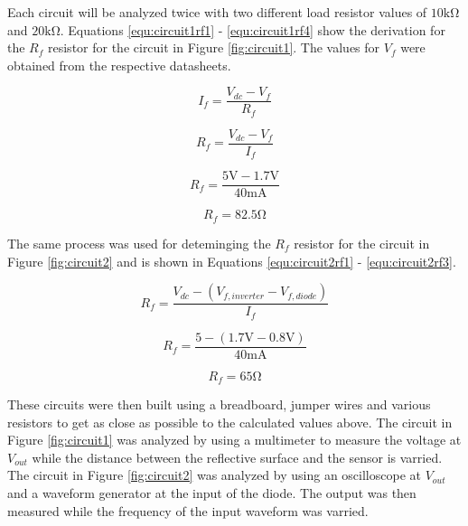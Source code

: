 \documentclass[CMPE]{KGCOEReport}
\begin{document}


Each circuit will be analyzed twice with two different load resistor values of 
$10\si{\kilo\ohm}$ and $20\si{\kilo\ohm}$. Equations \ref{equ:circuit1rf1} - \ref{equ:circuit1rf4}
show the derivation for the $R_f$ resistor for the circuit in Figure \ref{fig:circuit1}. The 
values for $V_f$ were obtained from the respective datasheets.

\begin{equation}
	\label{equ:circuit1rf1}
	I_f=\frac{V_{dc} - V_f}{R_f}
\end{equation}

\begin{equation}
	\label{equ:circuit1rf2}
	R_f=\frac{V_{dc} - V_f}{I_f}
\end{equation}

\begin{equation}
	\label{equ:circuit1rf3}
	R_f=\frac{5\si\volt - 1.7\si\volt}{40 \si{\milli\ampere}}
\end{equation}

\begin{equation}
	\label{equ:circuit1rf4}
	R_f= 82.5 \si\ohm
\end{equation}

The same process was used for deteminging the $R_f$ resistor for the circuit in Figure \ref{fig:circuit2}
and is shown in Equations \ref{equ:circuit2rf1} - \ref{equ:circuit2rf3}.

\begin{equation}
	\label{equ:circuit2rf1}
	R_f=\frac{V_{dc} - (V_{f,inverter} - V_{f,diode})}{I_f}
\end{equation}

\begin{equation}
	\label{equ:circuit2rf2}
	R_f=\frac{5 - (1.7\si\volt - 0.8\si\volt)}{40\si{\milli\ampere}}
\end{equation}

\begin{equation}
	\label{equ:circuit2rf3}
	R_f=65\si\ohm
\end{equation}


These circuits were then built using a breadboard, jumper wires and various 
resistors to get as close as possible to the calculated values above. The circuit
in Figure \ref{fig:circuit1} was analyzed by using a multimeter to measure the voltage 
at $V_{out}$ while the distance between the reflective surface and the sensor is varried.
The circuit in Figure \ref{fig:circuit2} was analyzed by using an oscilloscope at $V_{out}$ and 
a waveform generator at the input of the diode. The output was then measured while the frequency
of the input waveform was varried.
\end{document}
